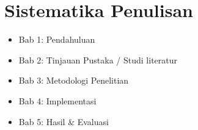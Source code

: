 

\section{Sistematika Penulisan}
\label{sec:sistematikaPenulisan}

\begin{itemize}
	\item Bab 1: Pendahuluan
	\item Bab 2: Tinjauan Pustaka / Studi literatur
	\item Bab 3: Metodologi Penelitian
	\item Bab 4: Implementasi
	\item Bab 5: Hasil \& Evaluasi
\end{itemize}

